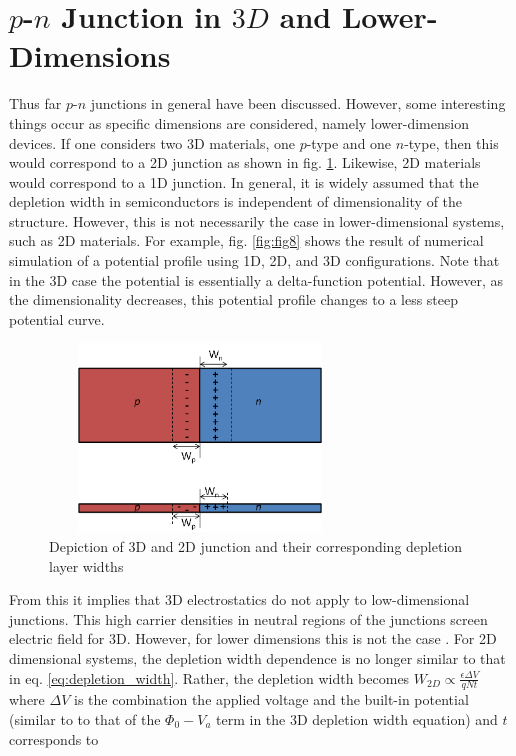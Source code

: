 \documentclass[%
 reprint,
 amsmath,amssymb,
 aps,
pra,
floatfix,
]{revtex4-1}
\begin{document}
\section{$p$-$n$ Junction in $3D$ and Lower-Dimensions}\label{sec:sec004}
Thus far $p$-$n$ junctions in general have been discussed. However, some interesting things occur as specific
dimensions are considered, namely lower-dimension devices. If one considers two 3D materials, one $p$-type and one $n$-type, then this would
correspond to a 2D junction as shown in fig. \ref{fig:fig10}. Likewise, 2D materials would correspond to a 1D junction. In general, it is widely assumed that the depletion width in 
semiconductors is independent of dimensionality of the structure. However, this is not necessarily the case in lower-dimensional systems, such as 2D materials.
For example, fig. \ref{fig:fig8} shows the result of numerical simulation of a potential profile using 1D, 2D, and 3D configurations. Note that in the 3D case
the potential is essentially a delta-function potential. However, as the dimensionality decreases, this potential profile changes to a less steep potential curve.
%
\begin{figure}[h!]
    \centering
    \includegraphics[height=5cm,width=8cm]{figs/2d3d_layers}
    \caption{Depiction of 3D and 2D junction and their corresponding depletion layer widths}
    \label{fig:fig10}
\end{figure}
%
From this it implies that 3D electrostatics do not apply to low-dimensional junctions. This high carrier densities in neutral regions of the junctions screen electric field for 3D.
However, for lower dimensions this is not the case \cite{Ilatikhameneh2016}. For 2D dimensional systems, the depletion width dependence is no longer similar to 
that in eq. \ref{eq:depletion_width}. Rather, the depletion width becomes $W_{2D}\propto \frac{\epsilon \Delta V}{qNt}$
where $\Delta V$ is the combination the applied voltage and the built-in potential (similar to to that of the $\Phi_0 - V_a$ term in the 3D depletion width equation) and $t$ corresponds to
\end{document}
